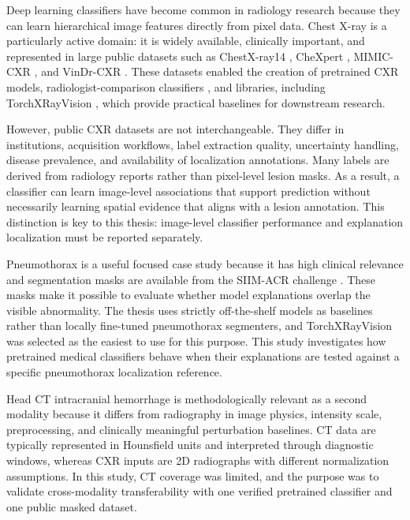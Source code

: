 Deep learning classifiers have become common in radiology research
because they can learn hierarchical image features directly from pixel
data. Chest X-ray is a particularly active domain: it is widely
available, clinically important, and represented in large public
datasets such as ChestX-ray14 \cite{ref-chestxray8}, CheXpert
\cite{ref-chexpert}, MIMIC-CXR \cite{ref-mimic-cxr}, and VinDr-CXR \cite{ref-vindr-cxr}.
These datasets enabled the creation of
pretrained CXR models, radiologist-comparison classifiers
\cite{ref-chexnext}, and libraries, including TorchXRayVision
\cite{ref-torchxrayvision}, which provide practical baselines for
downstream research.

However, public CXR datasets are not interchangeable. They differ in
institutions, acquisition workflows, label extraction quality,
uncertainty handling, disease prevalence, and availability of
localization annotations. Many labels are derived from radiology reports
rather than pixel-level lesion masks. As a result, a classifier can
learn image-level associations that support prediction without
necessarily learning spatial evidence that aligns with a lesion
annotation. This distinction is key to this thesis:
image-level classifier performance and explanation localization must be
reported separately.

Pneumothorax is a useful focused case study because it has high
clinical relevance and segmentation masks are available from the SIIM-ACR challenge
\cite{ref-siim-acr}.
These masks make it possible to evaluate whether model explanations
overlap the visible abnormality. The thesis uses strictly off-the-shelf
models as baselines rather than locally fine-tuned
pneumothorax segmenters, and TorchXRayVision was selected as the easiest to use for
this purpose. This study investigates how pretrained medical
classifiers behave when their explanations are tested against a specific
pneumothorax localization reference.

Head CT intracranial hemorrhage \cite{ref-rsna-ihd} is methodologically
relevant as a second modality because it differs from radiography in
image physics, intensity scale, preprocessing, and clinically meaningful
perturbation baselines. CT data are typically represented in Hounsfield
units and interpreted through diagnostic windows, whereas CXR inputs are
2D radiographs with different normalization assumptions. In this study,
CT coverage was limited, and the purpose was to validate cross-modality
transferability with one verified pretrained classifier and one public
masked dataset.

